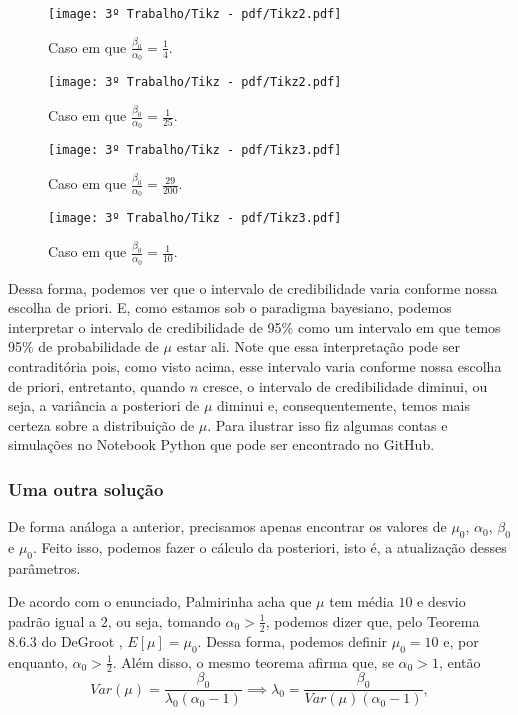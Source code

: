 \documentclass{article}
\begin{document}
\begin{multicols}{2}
    \begin{figure}[H]
        \texttt{[image: 3º Trabalho/Tikz - pdf/Tikz2.pdf]}
        \caption{Caso em que $\frac{\beta_0}{\alpha_0} = \frac{1}{4}$.}
    \end{figure}
    \begin{figure}[H]
        \texttt{[image: 3º Trabalho/Tikz - pdf/Tikz2.pdf]}
        \caption{Caso em que $\frac{\beta_0}{\alpha_0} = \frac{1}{25}$.}
    \end{figure}
    \begin{figure}[H]
        \texttt{[image: 3º Trabalho/Tikz - pdf/Tikz3.pdf]}
        \caption{Caso em que $\frac{\beta_0}{\alpha_0} = \frac{29}{200}$.}
    \end{figure}
    \begin{figure}[H]
        \texttt{[image: 3º Trabalho/Tikz - pdf/Tikz3.pdf]}
        \caption{Caso em que $\frac{\beta_0}{\alpha_0} = \frac{1}{10}$.}
    \end{figure}
\end{multicols}

Dessa forma, podemos ver que o intervalo de credibilidade varia conforme nossa escolha de priori. E, como estamos sob o paradigma bayesiano, podemos interpretar o intervalo de credibilidade de 95\% como um intervalo em que temos 95\% de probabilidade de $\mu$ estar ali. Note que essa interpretação pode ser contraditória pois, como visto acima, esse intervalo varia conforme nossa escolha de priori, entretanto, quando $n$ cresce, o intervalo de credibilidade diminui, ou seja, a variância a posteriori de $\mu$ diminui e, consequentemente, temos mais certeza sobre a distribuição de $\mu$. Para ilustrar isso fiz algumas contas e simulações no Notebook Python que pode ser encontrado no GitHub.

\subsubsection*{Uma outra solução}

De forma análoga a anterior, precisamos apenas encontrar os valores de $\mu_0$, $\alpha_0$, $\beta_0$ e $\mu_0$. Feito isso, podemos fazer o cálculo da posteriori, isto é, a atualização desses parâmetros.

De acordo com o enunciado, Palmirinha acha que $\mu$ tem média $10$ e desvio padrão igual a $2$, ou seja, tomando $\alpha_0 > \frac{1}{2}$, podemos dizer que, pelo Teorema 8.6.3 do DeGroot \cite{degroot}, $E[\mu] = \mu_0$. Dessa forma, podemos definir $\mu_0 = 10$ e, por enquanto, $\alpha_0 > \frac{1}{2}$. Além disso, o mesmo teorema afirma que, se $\alpha_0 > 1$, então
\[Var(\mu) = \dfrac{\beta_0}{\lambda_0 \left(\alpha_0 - 1\right)} \implies \lambda_0 = \dfrac{\beta_0}{Var(\mu) \left(\alpha_0 - 1\right)},\]
\end{document}
